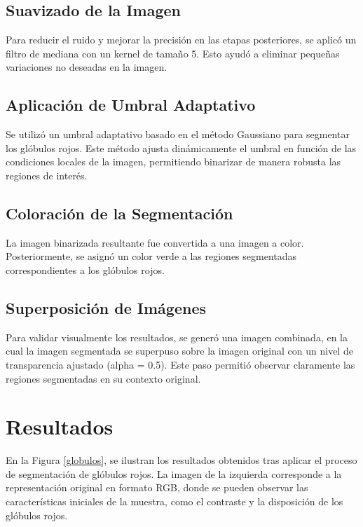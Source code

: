 \documentclass[journal]{IEEEtran}
\begin{document}
\subsection{Suavizado de la Imagen}
Para reducir el ruido y mejorar la precisión en las etapas posteriores, se aplicó un filtro de mediana con un kernel de tamaño 5. Esto ayudó a eliminar pequeñas variaciones no deseadas en la imagen.
\subsection{Aplicación de Umbral Adaptativo}
Se utilizó un umbral adaptativo basado en el método Gaussiano para segmentar los glóbulos rojos. Este método ajusta dinámicamente el umbral en función de las condiciones locales de la imagen, permitiendo binarizar de manera robusta las regiones de interés.
\subsection{Coloración de la Segmentación}
La imagen binarizada resultante fue convertida a una imagen a color. Posteriormente, se asignó un color verde a las regiones segmentadas correspondientes a los glóbulos rojos.
\subsection{Superposición de Imágenes}
Para validar visualmente los resultados, se generó una imagen combinada, en la cual la imagen segmentada se superpuso sobre la imagen original con un nivel de transparencia ajustado (alpha = 0.5). Este paso permitió observar claramente las regiones segmentadas en su contexto original.

\section{Resultados}
En la Figura \ref{globulos}, se ilustran los resultados obtenidos tras aplicar el proceso de segmentación de glóbulos rojos. La imagen de la izquierda corresponde a la representación original en formato RGB, donde se pueden observar las características iniciales de la muestra, como el contraste y la disposición de los glóbulos rojos.
\end{document}
